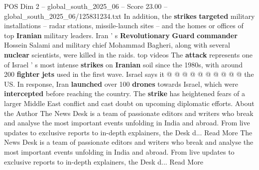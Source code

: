 \begin{textsample}{POS Dim 2 – global\_south\_2025\_06 – Score 23.00 – global\_south\_2025\_06/125831234.txt}
In addition, the \textbf{strikes} \textbf{targeted} military installations -- radar stations, missile-launch sites -- and the homes or offices of top \textbf{Iranian} military leaders.
Iran ' s \textbf{Revolutionary} \textbf{Guard} \textbf{commander} Hossein Salami and military chief Mohammad Bagheri, along with several \textbf{nuclear} scientists, were killed in the raids. top videos The \textbf{attack} represents one of Israel ' s most intense \textbf{strikes} on \textbf{Iranian} soil since the 1980s, with around 200 \textbf{fighter} \textbf{jets} used in the first wave.
Israel says it @ @ @ @ @ @ @ @ @ @ the US.
In response, Iran \textbf{launched} over 100 \textbf{drones} towards Israel, which were \textbf{intercepted} before reaching the country.
The \textbf{strike} has heightened fears of a larger Middle East conflict and cast doubt on upcoming diplomatic efforts.
About the Author The News Desk is a team of passionate editors and writers who break and analyse the most important events unfolding in India and abroad.
From live updates to exclusive reports to in-depth explainers, the Desk d...
Read More The News Desk is a team of passionate editors and writers who break and analyse the most important events unfolding in India and abroad.
From live updates to exclusive reports to in-depth explainers, the Desk d...
Read More

\end{textsample}
